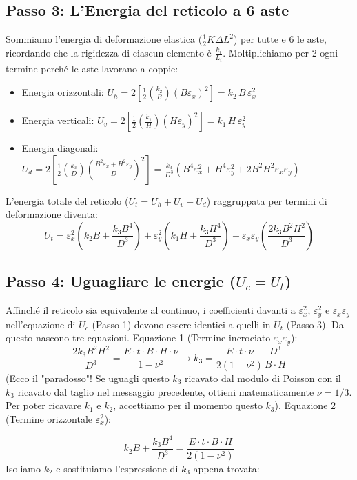 \documentclass[a4paper]{article}
\begin{document}
\subsection{Passo 3: L'Energia del reticolo a 6 aste}
Sommiamo l'energia di deformazione elastica ($\frac{1}{2} K \Delta L^2$) per tutte e 6 le aste, ricordando che la rigidezza di ciascun elemento è $\frac{k_i}{L_i}$. Moltiplichiamo per 2 ogni termine perché le aste lavorano a coppie:
\begin{itemize}
\item Energia orizzontali: $U_h = 2 \left[ \frac{1}{2} \left( \frac{k_2}{B} \right) (B \varepsilon_x)^2 \right] = k_2 \, B \, \varepsilon_x^2$
\item Energia verticali: $U_v = 2 \left[ \frac{1}{2} \left( \frac{k_1}{H} \right) (H \varepsilon_y)^2 \right] = k_1 \, H \, \varepsilon_y^2$
\item Energia diagonali: $U_d = 2 \left[ \frac{1}{2} \left( \frac{k_3}{D} \right) \left( \frac{B^2 \varepsilon_x + H^2 \varepsilon_y}{D} \right)^2 \right] = \frac{k_3}{D^3} \left( B^4 \varepsilon_x^2 + H^4 \varepsilon_y^2 + 2 B^2 H^2 \varepsilon_x \varepsilon_y \right)$
\end{itemize}
L'energia totale del reticolo ($U_t = U_h + U_v + U_d$) raggruppata per termini di deformazione diventa:
$$U_t = \varepsilon_x^2 \left( k_2 B + \frac{k_3 B^4}{D^3} \right) + \varepsilon_y^2 \left( k_1 H + \frac{k_3 H^4}{D^3} \right) + \varepsilon_x \varepsilon_y \left( \frac{2 k_3 B^2 H^2}{D^3} \right)$$
\subsection{Passo 4: Uguagliare le energie ($U_c = U_t$)}
Affinché il reticolo sia equivalente al continuo, i coefficienti davanti a $\varepsilon_x^2$, $\varepsilon_y^2$ e $\varepsilon_x \varepsilon_y$ nell'equazione di $U_c$ (Passo 1) devono essere identici a quelli in $U_t$ (Passo 3).
Da questo nascono tre equazioni.
Equazione 1 (Termine incrociato $\varepsilon_x \varepsilon_y$):
$$\frac{2 k_3 B^2 H^2}{D^3} = \frac{E \cdot t \cdot B \cdot H \cdot \nu}{1-\nu^2} \rightarrow k_3 = \frac{E \cdot t \cdot \nu}{2(1-\nu^2)} \frac{D^3}{B \cdot H}$$
(Ecco il "paradosso"! Se uguagli questo $k_3$ ricavato dal modulo di Poisson con il $k_3$ ricavato dal taglio nel messaggio precedente, ottieni matematicamente $\nu = 1/3$. Per poter ricavare $k_1$ e $k_2$, accettiamo per il momento questo $k_3$).
Equazione 2 (Termine orizzontale $\varepsilon_x^2$):

$$k_2 B + \frac{k_3 B^4}{D^3} = \frac{E \cdot t \cdot B \cdot H}{2(1-\nu^2)}$$
Isoliamo $k_2$ e sostituiamo l'espressione di $k_3$ appena trovata:
\end{document}
